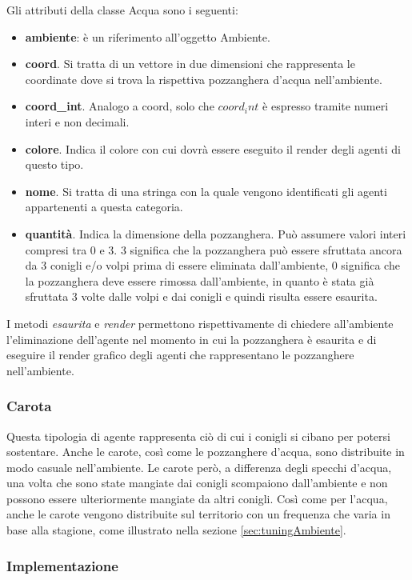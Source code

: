 \documentclass[11pt]{article}
\begin{document}
Gli attributi della classe Acqua sono i seguenti:
\begin{itemize}
    \item \textbf{ambiente}: è un riferimento all'oggetto Ambiente. 
    \item \textbf{coord}. Si tratta di un vettore in due dimensioni che rappresenta le coordinate dove si trova la rispettiva pozzanghera d'acqua nell'ambiente. 
    \item \textbf{coord\_int}. Analogo a coord, solo che $coord_int$ è espresso tramite numeri interi e non decimali. 
    \item \textbf{colore}. Indica il colore con cui dovrà essere eseguito il render degli agenti di questo tipo.
    \item \textbf{nome}. Si tratta di una stringa con la quale vengono identificati gli agenti appartenenti a questa categoria. 
    \item \textbf{quantità}. Indica la dimensione della pozzanghera. Può assumere valori interi compresi tra 0 e 3. 3 significa che la pozzanghera può essere sfruttata ancora da 3 conigli e/o volpi prima di essere eliminata dall'ambiente, 0 significa che la pozzanghera deve essere rimossa dall'ambiente, in quanto è stata già sfruttata 3 volte dalle volpi e dai conigli e quindi risulta essere esaurita. 
\end{itemize}

I metodi \emph{esaurita} e \emph{render} permettono rispettivamente di chiedere all'ambiente l'eliminazione dell'agente nel momento in cui la pozzanghera è esaurita e di eseguire il render grafico degli agenti che rappresentano le pozzanghere nell'ambiente. 



\subsubsection{Carota}
Questa tipologia di agente rappresenta ciò di cui i conigli si cibano per potersi sostentare. Anche le carote, così come le pozzanghere d'acqua, sono distribuite in modo casuale nell'ambiente. Le carote però, a differenza degli specchi d'acqua, una volta che sono state mangiate dai conigli scompaiono dall'ambiente e non possono essere ulteriormente mangiate da altri conigli. Così come per l'acqua, anche le carote vengono distribuite sul territorio con un frequenza che varia in base alla stagione, come illustrato nella sezione \ref{sec:tuningAmbiente}. 

\subsubsection{Implementazione}
\end{document}
